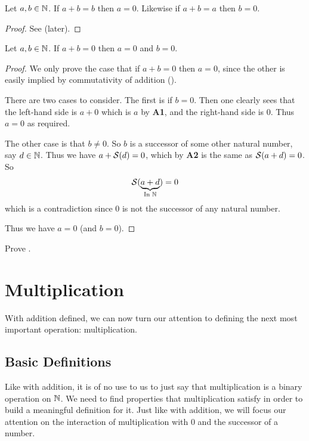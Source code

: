 \begin{proposition}\label{prop:addition-that-equals-self}
    Let $a, b \in \mathbb{N}$. If $a + b = b$ then $a = 0$. Likewise if $a + b = a$ then $b = 0$.
\end{proposition}
\begin{proof}
    See  (later).
\end{proof}

\begin{proposition}\label{prop:addition-that-equals-zero}
    Let $a, b \in \mathbb{N}$. If $a + b = 0$ then $a = 0$ and $b = 0$.
\end{proposition}
\begin{proof}
    We only prove the case that if $a + b = 0$ then $a = 0$, since the other is easily implied by commutativity of addition ().

    There are two cases to consider. The first is if $b = 0$. Then one clearly sees that the left-hand side is $a + 0$ which is $a$ by \textbf{A1}, and the right-hand side is 0. Thus $a = 0$ as required.

    The other case is that $b \neq 0$. So $b$ is a successor of some other natural number, say $d \in \mathbb{N}$. Thus we have $a + {\mathcal{S}(d)} = 0$, which by \textbf{A2} is the same as ${\mathcal{S}(a + d)} = 0$. So
    \[
        {\mathcal{S}(\underbrace{a + d}_{\text{In } \mathbb{N}})} = 0
    \]
    which is a contradiction since 0 is not the successor of any natural number.

    Thus we have $a = 0$ (and $b = 0$).
\end{proof}

\begin{exercise}\label{exercise:addition-that-equals-self}
    Prove .
\end{exercise}

\section{Multiplication}
With addition defined, we can now turn our attention to defining the next most important operation: multiplication.

\subsection{Basic Definitions}
Like with addition, it is of no use to us to just say that multiplication is a binary operation on $\mathbb{N}$. We need to find properties that multiplication satisfy in order to build a meaningful definition for it. Just like with addition, we will focus our attention on the interaction of multiplication with 0 and the successor of a number.

